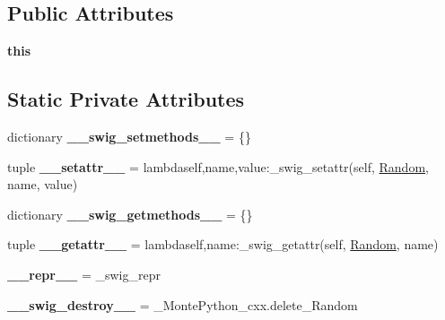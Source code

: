 \subsection*{Public Attributes}
\begin{DoxyCompactItemize}
\item 
\hypertarget{classMontePython__cxx_1_1Random_a81ab806cfec03caf91d5088bca565627}{}{\bfseries this}\label{classMontePython__cxx_1_1Random_a81ab806cfec03caf91d5088bca565627}

\end{DoxyCompactItemize}
\subsection*{Static Private Attributes}
\begin{DoxyCompactItemize}
\item 
\hypertarget{classMontePython__cxx_1_1Random_ad4ad1f0e3c209b94357ecc89d9f83098}{}dictionary {\bfseries \+\_\+\+\_\+swig\+\_\+setmethods\+\_\+\+\_\+} = \{\}\label{classMontePython__cxx_1_1Random_ad4ad1f0e3c209b94357ecc89d9f83098}

\item 
\hypertarget{classMontePython__cxx_1_1Random_ad6b059fca86be3a3be6d5fd47d8cd056}{}tuple {\bfseries \+\_\+\+\_\+setattr\+\_\+\+\_\+} = lambdaself,name,value\+:\+\_\+swig\+\_\+setattr(self, \hyperlink{classMontePython__cxx_1_1Random}{Random}, name, value)\label{classMontePython__cxx_1_1Random_ad6b059fca86be3a3be6d5fd47d8cd056}

\item 
\hypertarget{classMontePython__cxx_1_1Random_a81487f04ed09523e8582b92f15b6cb74}{}dictionary {\bfseries \+\_\+\+\_\+swig\+\_\+getmethods\+\_\+\+\_\+} = \{\}\label{classMontePython__cxx_1_1Random_a81487f04ed09523e8582b92f15b6cb74}

\item 
\hypertarget{classMontePython__cxx_1_1Random_a7dbf190a639c30a636c96fba6d7e8596}{}tuple {\bfseries \+\_\+\+\_\+getattr\+\_\+\+\_\+} = lambdaself,name\+:\+\_\+swig\+\_\+getattr(self, \hyperlink{classMontePython__cxx_1_1Random}{Random}, name)\label{classMontePython__cxx_1_1Random_a7dbf190a639c30a636c96fba6d7e8596}

\item 
\hypertarget{classMontePython__cxx_1_1Random_a5ddf454a95b9528f6a6376e58ba74743}{}{\bfseries \+\_\+\+\_\+repr\+\_\+\+\_\+} = \+\_\+swig\+\_\+repr\label{classMontePython__cxx_1_1Random_a5ddf454a95b9528f6a6376e58ba74743}

\item 
\hypertarget{classMontePython__cxx_1_1Random_a9355234d12c781ed3fa5891c1f74c086}{}{\bfseries \+\_\+\+\_\+swig\+\_\+destroy\+\_\+\+\_\+} = \+\_\+\+Monte\+Python\+\_\+cxx.\+delete\+\_\+\+Random\label{classMontePython__cxx_1_1Random_a9355234d12c781ed3fa5891c1f74c086}

\end{DoxyCompactItemize}


